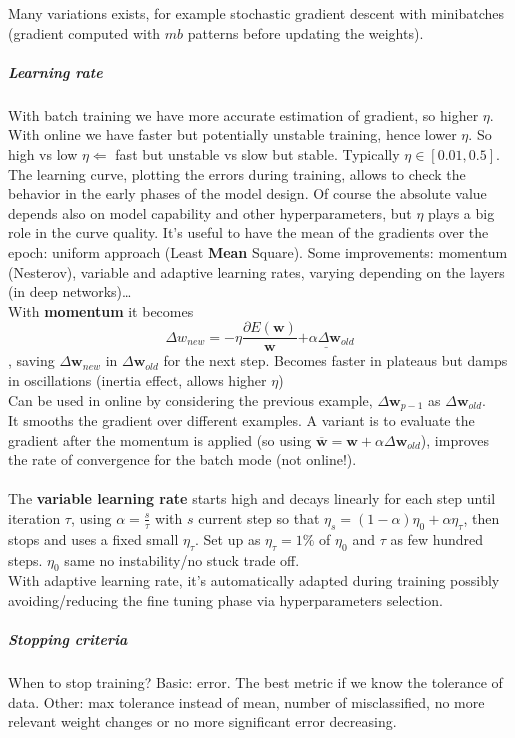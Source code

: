 \documentclass[10pt]{report}
\begin{document}
Many variations exists, for example stochastic gradient descent with minibatches (gradient computed with $mb$ patterns before updating the weights).
\subparagraph{Learning rate} With batch training we have more accurate estimation of gradient, so higher $\eta$. With online we have faster but potentially unstable training, hence lower $\eta$. So high vs low $\eta \Leftarrow$ fast but unstable vs slow but stable. Typically $\eta \in [0.01, 0.5]$.\\
The learning curve, plotting the errors during training, allows to check the behavior in the early phases of the model design. Of course the absolute value depends also on model capability and other hyperparameters, but $\eta$ plays a big role in the curve quality. It's useful to have the mean of the gradients over the epoch: uniform approach (Least \textbf{Mean} Square). Some improvements: momentum (Nesterov), variable and adaptive learning rates, varying depending on the layers (in deep networks)\ldots\\
With \textbf{momentum} it becomes $$\Delta w_{new} = -\eta\frac{\partial E(\mathbf{w})}{\mathbf{w}} \underline{+ \alpha\Delta \mathbf{w}_{old}}$$, saving $\Delta \mathbf{w}_{new}$ in $\Delta \mathbf{w}_{old}$ for the next step. Becomes faster in plateaus but damps in oscillations (inertia effect, allows higher $\eta$)\\
Can be used in online by considering the previous example, $\Delta \mathbf{w}_{p-1}$ as $\Delta \mathbf{w}_{old}$.\\
It smooths the gradient over different examples. A variant is to evaluate the gradient after the momentum is applied (so using $\overline{\mathbf{w}} = \mathbf{w} + \alpha\Delta \mathbf{w}_{old}$), improves the rate of convergence for the batch mode (not online!).\\\\
The \textbf{variable learning rate} starts high and decays linearly for each step until iteration $\tau$, using $\alpha = \frac{s}{\tau}$ with $s$ current step so that $\eta_s = (1-\alpha)\eta_0 + \alpha\eta_\tau$, then stops and uses a fixed small $\eta_\tau$. Set up as $\eta_\tau = 1\%$ of $\eta_0$ and $\tau$ as few hundred steps. $\eta_0$ same no instability/no stuck trade off.\\
With adaptive learning rate, it's automatically adapted during training possibly avoiding/reducing the fine tuning phase via hyperparameters selection.
\subparagraph{Stopping criteria} When to stop training? Basic: error. The best metric if we know the tolerance of data. Other: max tolerance instead of mean, number of misclassified, no more relevant weight changes or no more significant error decreasing.\\
\end{document}
